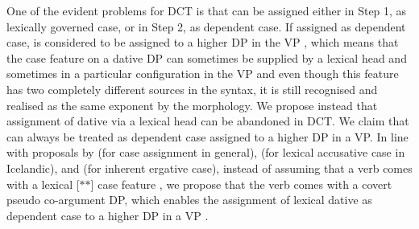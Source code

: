 \documentclass[output=paper,
modfonts,
newtxmath,
hidelinks
]{langscibook}
\begin{document}
One of the evident problems for DCT is that \datt{} can be assigned either in Step 1, as lexically governed case, or in Step 2, as dependent case. If assigned as dependent case, \datt{} is considered to be assigned to a higher DP in the VP \citep{bakervinokurova,baker15}, which means that the case feature on a dative DP can sometimes be supplied by a lexical head and sometimes in a particular configuration in the VP and even though this feature has two completely different sources in the syntax, it is still recognised and realised as the same exponent by the morphology. We propose instead that assignment of dative via a lexical head can be abandoned in DCT. We claim that \datt{} can always be treated as dependent case assigned to a higher DP in a VP. In line with proposals by \citet{bittnerhale96,baker15} (for case assignment in general), \citet{wood2016} (for lexical accusative case in Icelandic), and \citet{bakerbobaljik} (for inherent ergative case), instead of assuming that a verb comes with a lexical [$*$\datt$*$] case feature , we propose that the verb comes with a covert pseudo co-argument DP, which enables the assignment of lexical dative as dependent case to a higher DP in a VP .
\end{document}

